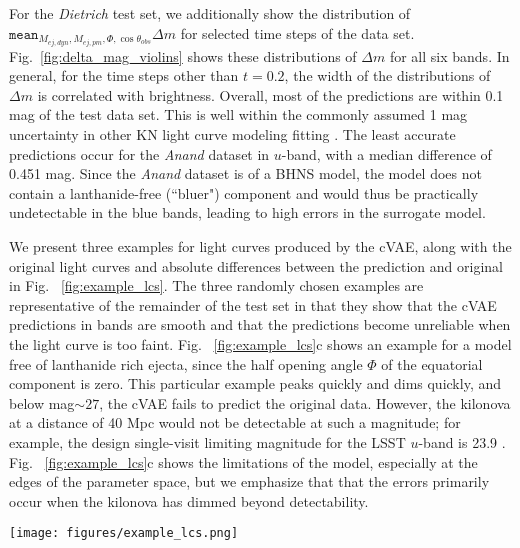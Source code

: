 \documentclass[fleqn,usenatbib,useAMS]{mnras}
\begin{document}
For the \emph{Dietrich} test set, we additionally show the distribution of $\texttt{mean}_{M_{ej, dyn}, M_{ej, pm}, \Phi, \cos \theta_{obs}} \Delta m$ for selected time steps of the data set.
Fig.~\ref{fig:delta_mag_violins} shows these distributions of $\Delta m$ for all six bands.
In general, for the time steps other than $t=0.2$, the width of the distributions of $\Delta m$ is correlated with brightness. 
Overall, most of the predictions are within 0.1 mag of the test data set.
This is well within the commonly assumed 1 mag uncertainty in other KN light curve modeling fitting  \citep{coughlinConstraintsNeutronStar2018}.
The least accurate predictions occur for the \emph{Anand} dataset in $u$-band, with a median difference of 0.451 mag.
Since the \emph{Anand} dataset is of a BHNS model, the model does not contain a lanthanide-free (``bluer") component and would thus be practically undetectable in the blue bands, leading to high errors in the surrogate model.

We present three examples for light curves produced by the cVAE, along with the original light curves and absolute differences between the prediction and original in Fig.~ \ref{fig:example_lcs}.
The three randomly chosen examples are representative of the remainder of the test set in that they show that the cVAE predictions in bands are smooth and that the predictions become unreliable when the light curve is too faint.
Fig.~ \ref{fig:example_lcs}c shows an example for a model free of lanthanide rich ejecta, since the half opening angle $\Phi$ of the equatorial component is zero.
This particular example peaks quickly and dims quickly, and below mag$\sim27$, the cVAE fails to predict the original data.
However, the kilonova at a distance of 40 Mpc would not be detectable at such a magnitude; for example, the design single-visit limiting magnitude for the LSST $u$-band is 23.9 \citep{ivezicLSSTScienceDrivers2019}.
Fig.~ \ref{fig:example_lcs}c shows the limitations of the model, especially at the edges of the parameter space, but we emphasize that that the errors primarily occur when the kilonova has dimmed beyond detectability. 


\begin{figure*}
    \centering
    \texttt{[image: figures/example\_lcs.png]}
    \caption{Three example light curves from the \emph{Dietrich} BNS datasets for the original dataset (dashed lines) and the cVAE predictions (solid lines) for the six $ugrizy$ bands (colors black through yellow), as well as the residuals between original and prediction for each lightcurve and band. 
    The three parameter sets are 
    (a) $M_{ej, dyn}/M_{\odot}=0.01$, $M_{ej, pm}/M_{\odot}=0.09$, $\Phi$= 30.0, $\cos \Theta_{obs}$=0.3, 
    (b) $M_{ej, dyn}/M_{\odot}=0.001$, $M_{ej, pm}/M_{\odot}=0.11$, $\Phi=75.0$, $\cos\Theta_{obs}=0.0$,
    (c)$M_{ej, dyn}/M_{\odot}=0.02$, $M_{ej, pm}/M_{\odot}=0.01$, $\Phi$: 0.0, $\cos\Theta_{obs}$=0.3. 
    The lower panels indicate the  differences between the predicted light curve and the original as a function of time, for each light curve.}
    \label{fig:example_lcs}
\end{figure*}
\end{document}
